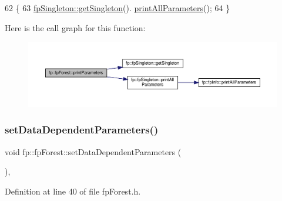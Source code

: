 \begin{DoxyCode}
62                                          \{
63                 \hyperlink{classfp_1_1fpSingleton_a8bdae77b68521003e3fc630edec2e240}{fpSingleton::getSingleton}().
      \hyperlink{classfp_1_1fpSingleton_a0d769b6652e4c74c2734cdc811eeab5a}{printAllParameters}();
64             \}
\end{DoxyCode}
Here is the call graph for this function\+:
\nopagebreak
\begin{figure}[H]
\begin{center}
\leavevmode
\includegraphics[width=350pt]{classfp_1_1fpForest_ae096def0ca26f0771b27341d7b218066_cgraph}
\end{center}
\end{figure}
\mbox{\label{classfp_1_1fpForest_a846818c46a4423f668f19d3493864192}} 
\subsubsection{\texorpdfstring{set\+Data\+Dependent\+Parameters()}{setDataDependentParameters()}}
{\footnotesize\ttfamily void fp\+::fp\+Forest\+::set\+Data\+Dependent\+Parameters (\begin{DoxyParamCaption}{ }\end{DoxyParamCaption})\hspace{0.3cm}{\ttfamily [inline]}, {\ttfamily [protected]}}



Definition at line 40 of file fp\+Forest.\+h.


